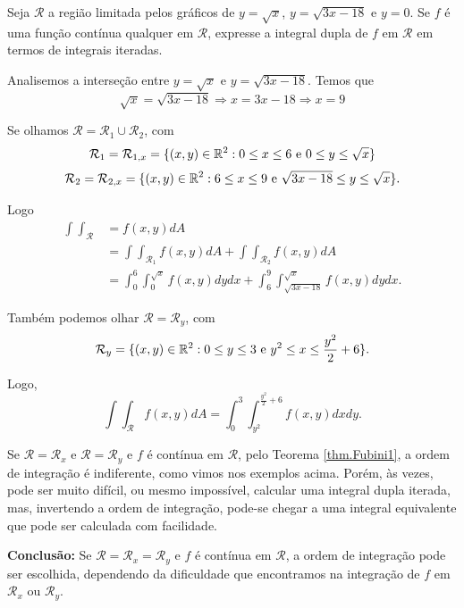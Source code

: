 \begin{example}
    Seja \(\mathcal{R}\) a região limitada pelos gráficos de \(y = \sqrt{x}\), \(y = \sqrt{3x - 18}\) e \(y=0\). Se \(f\) é uma função contínua qualquer em \(\mathcal{R}\), expresse a integral dupla de \(f\) em \(\mathcal{R}\) em termos de integrais iteradas.

    Analisemos a interseção entre \(y = \sqrt{x}\) e \(y = \sqrt{3x-18}\). Temos que \[\sqrt{x} = \sqrt{3x - 18} \Rightarrow x = 3x - 18 \Rightarrow x=9\]

    Se olhamos \(\mathcal{R} = \mathcal{R}_1\cup\mathcal{R}_2\), com \[\mathcal{R}_1 = \mathcal{R}_{1,x} = \{(x,y)\in\mathbb{R}^2 : 0\leq x\leq 6 \text{ e } 0\leq y\leq \sqrt{x}\}\] \[\mathcal{R}_2 = \mathcal{R}_{2,x} = \{(x,y)\in\mathbb{R}^2 : 6\leq x \leq 9 \text{ e } \sqrt{3x-18}\leq y\leq \sqrt{x}\}.\]

    Logo
        \begin{align*}
            \int\int_\mathcal{R} 
                & = f(x,y) dA \\
                & = \int\int_{\mathcal{R}_1} f(x,y) dA + \int\int_{\mathcal{R}_2} f(x,y) dA \\
                & = \int_0^6\int_0^{\sqrt{x}} f(x,y) dydx + \int_6^9\int_{\sqrt{3x-18}}^{\sqrt{x}} f(x,y) dy dx.
        \end{align*}

    Também podemos olhar \(\mathcal{R} = \mathcal{R}_y\), com \[\mathcal{R}_y = \{(x,y)\in\mathbb{R}^2 : 0 \leq y \leq 3 \text{ e } y^2 \leq x \leq \frac{y^2}{2} + 6\}.\]

    Logo, \[\int\int_\mathcal{R} f(x,y) dA = \int_0^3 \int_{y^2}^{\frac{y^2}{2}+6} f(x,y) dxdy.\]
\end{example}

\begin{remark}
    Se \(\mathcal{R} = \mathcal{R}_x\) e \(\mathcal{R} = \mathcal{R}_y\) e \(f\) é contínua em \(\mathcal{R}\), pelo Teorema \ref{thm.Fubini1}, a ordem de integração é indiferente, como vimos nos exemplos acima. Porém, às vezes, pode ser muito difícil, ou mesmo impossível, calcular uma integral dupla iterada, mas, invertendo a ordem de integração, pode-se chegar a uma integral equivalente que pode ser calculada com facilidade.

    \textbf{Conclusão: } Se \(\mathcal{R} = \mathcal{R}_x = \mathcal{R}_y\) e \(f\) é contínua em \(\mathcal{R}\), a ordem de integração pode ser escolhida, dependendo da dificuldade que encontramos na integração de \(f\) em \(\mathcal{R}_x\) ou \(\mathcal{R}_y\).
\end{remark}

